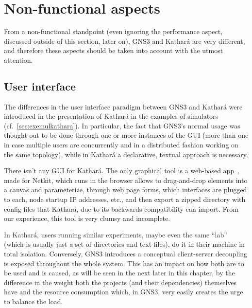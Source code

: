 \section{Non-functional aspects}
\label{sec:comparativenonfunctional}

From a non-functional standpoint (even ignoring the performance aspect, discussed outside of this section, later on), GNS3 and Kathará are very different, and therefore these aspects should be taken into account with the utmost attention.

\subsection{User interface}
\label{subsec:comparativeui}

The differences in the user interface paradigm between GNS3 and Kathará were introduced in the presentation of Kathará in the examples of simulators (cf.~\ref{sec:exemulkathara}).
In particular, the fact that GNS3's normal usage was thought out to be done through one or more instances of the GUI (more than one in case multiple users are concurrently and in a distributed fashion working on the same topology), while in Kathará a declarative, textual approach is necessary.

There isn't any GUI for Kathará.
The only graphical tool is a web-based app~\cite{netkitlabgen}, made for Netkit, which runs in the browser allows to drag-and-drop elements into a canvas and parameterize, through web page forms, which interfaces are plugged to each, node startup IP addresses, etc., and then export a zipped directory with config files that Kathará, due to its backwards compatibility can import.
From our experience, this tool is very clumsy and incomplete.

In Kathará, users running similar experiments, maybe even the same ``lab'' (which is usually just a set of directories and text files), do it in their machine in total isolation.
Conversely, GNS3 introduces a conceptual client-server decoupling is exposed throughout the whole system.
This has an impact on how both are to be used and is caused, as will be seen in the next later in this chapter, by the difference in the weight both the projects (and their dependencies) themselves have and the resource consumption which, in GNS3, very easily creates the urge to balance the load.



